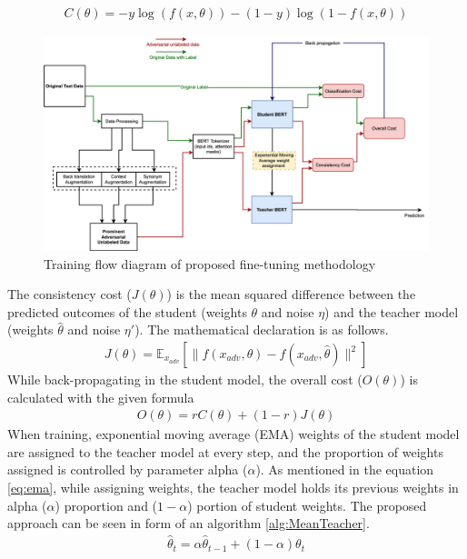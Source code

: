 \documentclass[%
	BCOR=8mm, %
	DIV=12,
	toc=bibliography, %
	toc=listof, %
	oneside, %
	egregdoesnotlikesansseriftitles, %
	]{scrbook}
\begin{document}
\begin{equation}
    \begin{aligned}
        C( \theta )=-y \log (f(x,\theta))-(1-y) \log(1-f(x,\theta))
        \label{eq:classification_cost}
    \end{aligned}
\end{equation}
 \begin{figure}[h!]
    \centering
    \includegraphics[width=1.1\textwidth]{img/Methodology.png}
    \caption[Training flow diagram of proposed fine-tuning approach]{Training flow diagram of proposed fine-tuning methodology }
    \label{diag:advMTBERT}
\end{figure}
The consistency cost ($J(\theta)$)  is the mean squared difference between the predicted outcomes of the student (weights $\theta$ and noise $\eta$) and the teacher model (weights $\hat\theta$ and noise $\eta'$).  The mathematical declaration is as follows. 
\begin{equation}
    \begin{aligned}
        J( \theta )=\mathbb{E}_{x_{adv}}[\|f(x_{adv},\theta)-f(x_{adv},\hat\theta)\|^2]
        \label{eq:ADVconsistencycost}
    \end{aligned}
\end{equation}
While back-propagating in the student model, the overall cost ($\textit{O}(\theta)$) is calculated with the given formula 
 \begin{equation}
     \begin{aligned}
         \textit{O}(\theta)= r C(\theta)+(1-r)J(\theta)
         \label{eq:overallcost}
         \end{aligned}
   \end{equation}
   When training, exponential moving average (EMA) weights of the student model are assigned to the teacher model at every step, and the proportion of weights assigned is controlled by parameter alpha ($\alpha$). As mentioned in the equation \ref{eq:ema}, while assigning weights, the teacher model holds its previous weights in alpha ($\alpha$) proportion and ($1-\alpha$) portion of student weights. The proposed approach can be seen in form of an algorithm \ref{alg:MeanTeacher}.
 \begin{equation}
     \begin{aligned}
         \hat\theta_t= \alpha\hat\theta_{t-1}+(1-\alpha)\theta_t
         \label{eq:ema}
         \end{aligned}
  \end{equation}
\end{document}
